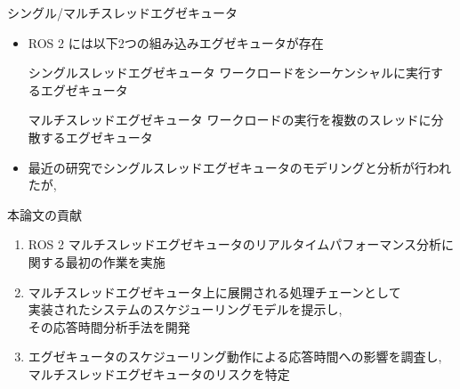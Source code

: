 \begin{frame}{シングル/マルチスレッドエグゼキュータ}
    \begin{itemize}
        \item ROS 2 には以下2つの組み込みエグゼキュータが存在
            \begin{block}{シングルスレッドエグゼキュータ}
                ワークロードをシーケンシャルに実行するエグゼキュータ
            \end{block}
            \begin{block}{マルチスレッドエグゼキュータ}
                ワークロードの実行を複数のスレッドに分散するエグゼキュータ
            \end{block}
        \vspace{5mm}
        \item 最近の研究でシングルスレッドエグゼキュータのモデリングと分析が行われたが, 
    \end{itemize}
\end{frame}

\begin{frame}{本論文の貢献}
    \begin{enumerate}
        \item ROS 2 マルチスレッドエグゼキュータのリアルタイムパフォーマンス分析に\\関する最初の作業を実施
        \item マルチスレッドエグゼキュータ上に展開される処理チェーンとして\\実装されたシステムのスケジューリングモデルを提示し,\\その応答時間分析手法を開発
        \item エグゼキュータのスケジューリング動作による応答時間への影響を調査し, マルチスレッドエグゼキュータのリスクを特定
    \end{enumerate}
\end{frame}

